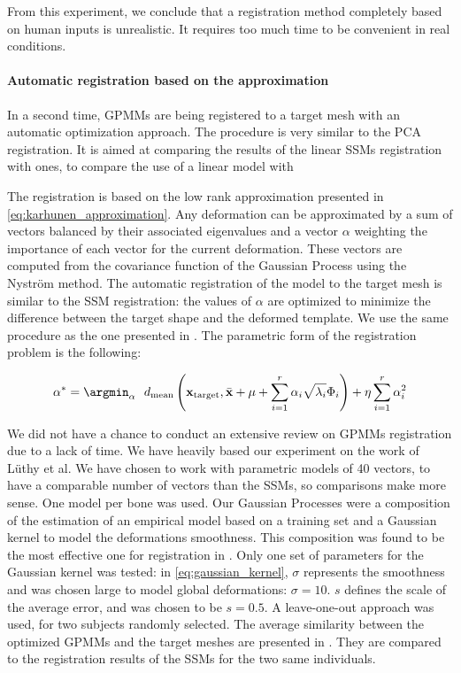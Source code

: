 From this experiment, we conclude that a registration method completely based on human inputs is unrealistic. It requires too much time to be convenient in real conditions. 

\paragraph{Automatic registration based on the \kl* approximation}

In a second time, GPMMs are being registered to a target mesh with an automatic optimization approach. The procedure is very similar to the PCA registration. It is aimed at comparing the results of the linear SSMs registration with ones, to compare the use of a linear model with 


The registration is based on the low rank \kl* approximation presented in \eqref{eq:karhunen_approximation}. Any deformation can be approximated by a sum of vectors balanced by their associated eigenvalues and a vector $\alpha$ weighting the importance of each vector for the current deformation. These vectors are computed from the covariance function of the Gaussian Process using the Nyström method. The automatic registration of the model to the target mesh is similar to the SSM registration: the values of $\alpha$ are optimized to minimize the difference between the target shape and the deformed template. We use the same procedure as the one presented in \cite{luthi_2017_gaussian}. The parametric form of the registration problem is the following: 

\begin{equation}
	\alpha^{*} = \argmin_{\alpha} \ \ d_\text{mean} \left(\mathbf{x}_\text{target}, \bar{\mathbf{x}} +\mu + \sum_{i=1}^{r} \alpha_i \sqrt{\lambda_i} \Phi_i \right) + \eta \sum_{i=1}^r \alpha_i^2
\end{equation}


We did not have a chance to conduct an extensive review on GPMMs registration due to a lack of time. We have heavily based our experiment on the work of Lüthy et al. We have chosen to work with parametric models of 40 vectors, to have a comparable number of vectors than the SSMs, so comparisons make more sense. One model per bone was used. Our Gaussian Processes were a composition of the estimation of an empirical model based on a training set and a Gaussian kernel to model the deformations smoothness. This composition was found to be the most effective one for registration in \cite{luthi_2013_unified}. Only one set of parameters for the Gaussian kernel was tested: in \eqref{eq:gaussian_kernel}, $\sigma$ represents the smoothness and was chosen large to model global deformations: $\sigma = 10$. $s$ defines the scale of the average error, and was chosen to be $s=0.5$. A leave-one-out approach was used, for two subjects randomly selected. The average similarity between the optimized GPMMs and the target meshes are presented in . They are compared to the registration results of the SSMs for the two same individuals. 


